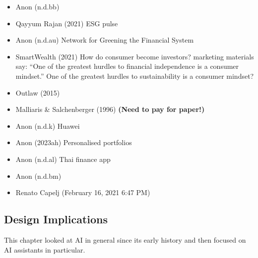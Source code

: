 \documentclass[
  letterpaper,
  DIV=11,
  numbers=noendperiod]{scrartcl}
\begin{document}
\begin{itemize}
\item
  Anon (n.d.bb)
\item
  Qayyum Rajan (2021) ESG pulse
\item
  Anon (n.d.au) Network for Greening the Financial System
\item
  SmartWealth (2021) How do consumer become investors? marketing
  materials say: ``One of the greatest hurdles to financial independence
  is a consumer mindset.'' One of the greatest hurdles to sustainability
  is a consumer mindset?
\item
  Outlaw (2015)
\item
  Malliaris \& Salchenberger (1996) \textbf{(Need to pay for paper!)}
\item
  Anon (n.d.k) Huawei
\item
  Anon (2023ah) Personalised portfolios
\item
  Anon (n.d.al) Thai finance app
\item
  Anon (n.d.bm)
\item
  Renato Capelj (February 16, 2021 6:47 PM)
\end{itemize}

\subsection{Design Implications}\label{design-implications-3}

This chapter looked at AI in general since its early history and then
focused on AI assistants in particular.
\end{document}
